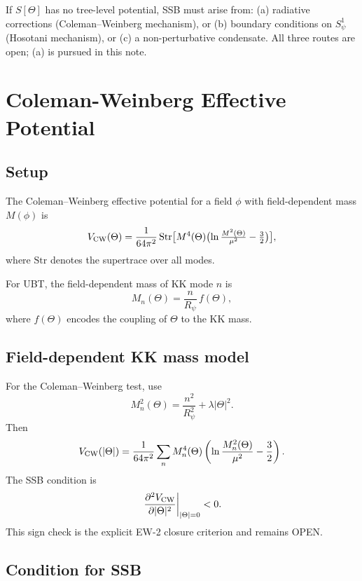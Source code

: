 \documentclass[12pt,a4paper]{article}
\begin{document}
\begin{openproblembox}
If $S[\Theta]$ has no tree-level potential, SSB must arise from:
(a) radiative corrections (Coleman--Weinberg mechanism), or
(b) boundary conditions on $S^1_\psi$ (Hosotani mechanism), or
(c) a non-perturbative condensate.
All three routes are open; (a) is pursued in this note.
\end{openproblembox}

\section{Coleman-Weinberg Effective Potential}
\label{sec:coleman_weinberg}

\subsection{Setup}

The Coleman--Weinberg effective potential for a field $\phi$ with
field-dependent mass $M(\phi)$ is
\begin{equation}
  \label{eq:CW_potential}
  V_{\rm CW}(\Theta) = \frac{1}{64\pi^2}\,
  \mathrm{Str}\bigl[M^4(\Theta)\bigl(\ln\tfrac{M^2(\Theta)}{\mu^2}
  - \tfrac{3}{2}\bigr)\bigr],
\end{equation}
where $\mathrm{Str}$ denotes the supertrace over all modes.

For UBT, the field-dependent mass of KK mode $n$ is
\[
  M_n(\Theta) = \frac{n}{R_\psi}\,f(\Theta),
\]
where $f(\Theta)$ encodes the coupling of $\Theta$ to the KK mass.

\subsection{Field-dependent KK mass model}

For the Coleman--Weinberg test, use
\[
M_n^2(\Theta)=\frac{n^2}{R_\psi^2}+\lambda|\Theta|^2.
\]
Then
\[
V_{\rm CW}(|\Theta|)=\frac{1}{64\pi^2}\sum_n M_n^4(\Theta)
\left(\ln\frac{M_n^2(\Theta)}{\mu^2}-\frac32\right).
\]
The SSB condition is
\[
\left.\frac{\partial^2 V_{\rm CW}}{\partial |\Theta|^2}\right|_{|\Theta|=0}<0.
\]
This sign check is the explicit EW-2 closure criterion and remains OPEN.

\subsection{Condition for SSB}
\end{document}
